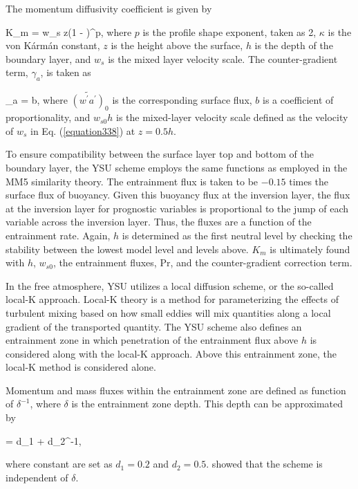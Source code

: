 The momentum diffusivity coefficient is given by

\bea
K_m = \kappa w_s z\left(1 - \right)^p, \label{equation338}
\eea
\noindent
 where $p$ is the profile shape exponent, taken as 2, $\kappa$ is the von K\'{a}rm\'{a}n constant, $z$ is the height above the surface, $h$ is the depth of the boundary layer, and $w_s$ is the mixed layer velocity scale. The counter-gradient term, $\gamma_a$, is taken as

\be
\gamma_a = b,\label{equation339}
\ee
\noindent
 where $\widetilde{(w^{\prime}a^{\prime})}_0$ is the corresponding surface flux, $b$ is a coefficient of proportionality, and $w_{s0}h$ is the mixed-layer velocity scale defined as the velocity of $w_s$ in Eq. (\autoref{equation338}) at $z=0.5h$.

To ensure compatibility between the surface layer top and bottom of the boundary layer, the YSU scheme employs the same  \citet{Dyer} functions as employed in the MM5 similarity theory. The entrainment flux is taken to be $-0.15$ times the surface flux of buoyancy. Given this buoyancy flux at the inversion layer, the flux at the inversion layer for prognostic variables is proportional to the jump of each variable across the inversion layer. Thus, the fluxes are a function of the entrainment rate. Again, $h$ is determined as the first neutral level by checking the stability between the lowest model level and levels above. $K_m$ is ultimately found with $h$, $w_{s0}$, the entrainment fluxes, $\mathrm{Pr}$, and the counter-gradient correction term.

In the free atmosphere, YSU utilizes a local diffusion scheme, or the so-called local-K approach. Local-K theory is a method for parameterizing the effects of turbulent mixing based on how small eddies will mix quantities along a local gradient of the transported quantity. The YSU scheme also defines an entrainment zone in which penetration of the entrainment flux above $h$ is considered along with the local-K approach. Above this entrainment zone, the local-K method is considered alone.

Momentum and mass fluxes within the entrainment zone are defined as function of $\delta^{-1}$, where $\delta$ is the entrainment zone depth. This depth can be approximated by

\be
{} = d_1 + d_2^{-1}, \label{equation340}
\ee

where constant are set as $d_1=0.2$ and $d_2=0.5$.  \citet{Hong06} showed that the scheme is independent of $\delta$.


